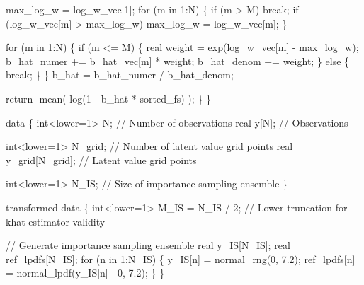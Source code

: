 \documentclass[
  letterpaper,
  DIV=11,
  numbers=noendperiod]{scrartcl}
\newenvironment{Shaded}{\begin{snugshade}}{\end{snugshade}}
\newcommand{\CommentTok}[1]{\textcolor[rgb]{0.37,0.37,0.37}{#1}}
\newcommand{\ControlFlowTok}[1]{\textcolor[rgb]{0.00,0.23,0.31}{#1}}
\newcommand{\DataTypeTok}[1]{\textcolor[rgb]{0.68,0.00,0.00}{#1}}
\newcommand{\DecValTok}[1]{\textcolor[rgb]{0.68,0.00,0.00}{#1}}
\newcommand{\FloatTok}[1]{\textcolor[rgb]{0.68,0.00,0.00}{#1}}
\newcommand{\KeywordTok}[1]{\textcolor[rgb]{0.00,0.23,0.31}{#1}}
\newcommand{\NormalTok}[1]{\textcolor[rgb]{0.00,0.23,0.31}{#1}}
\begin{document}
\begin{codelisting}
\begin{Shaded}
\begin{Highlighting}[]
\NormalTok{    max\_log\_w = log\_w\_vec[}\DecValTok{1}\NormalTok{];}
    \ControlFlowTok{for}\NormalTok{ (m }\ControlFlowTok{in} \DecValTok{1}\NormalTok{:N) \{}
      \ControlFlowTok{if}\NormalTok{ (m \textgreater{} M) }\ControlFlowTok{break}\NormalTok{;}
      \ControlFlowTok{if}\NormalTok{ (log\_w\_vec[m] \textgreater{} max\_log\_w) max\_log\_w = log\_w\_vec[m];}
\NormalTok{    \}}

    \ControlFlowTok{for}\NormalTok{ (m }\ControlFlowTok{in} \DecValTok{1}\NormalTok{:N) \{}
      \ControlFlowTok{if}\NormalTok{ (m \textless{}= M) \{}
        \DataTypeTok{real}\NormalTok{ weight = exp(log\_w\_vec[m] {-} max\_log\_w);}
\NormalTok{        b\_hat\_numer += b\_hat\_vec[m] * weight;}
\NormalTok{        b\_hat\_denom += weight;}
\NormalTok{      \} }\ControlFlowTok{else}\NormalTok{ \{}
        \ControlFlowTok{break}\NormalTok{;}
\NormalTok{      \}}
\NormalTok{    \}}
\NormalTok{    b\_hat = b\_hat\_numer / b\_hat\_denom;}

    \ControlFlowTok{return}\NormalTok{ {-}mean( log(}\DecValTok{1}\NormalTok{ {-} b\_hat * sorted\_fs) );}
\NormalTok{  \}}
\NormalTok{\}}

\KeywordTok{data}\NormalTok{ \{}
  \DataTypeTok{int}\NormalTok{\textless{}}\KeywordTok{lower}\NormalTok{=}\DecValTok{1}\NormalTok{\textgreater{} N; }\CommentTok{// Number of observations}
  \DataTypeTok{real}\NormalTok{ y[N];      }\CommentTok{// Observations}

  \DataTypeTok{int}\NormalTok{\textless{}}\KeywordTok{lower}\NormalTok{=}\DecValTok{1}\NormalTok{\textgreater{} N\_grid; }\CommentTok{// Number of latent value grid points}
  \DataTypeTok{real}\NormalTok{ y\_grid[N\_grid]; }\CommentTok{// Latent value grid points}

  \DataTypeTok{int}\NormalTok{\textless{}}\KeywordTok{lower}\NormalTok{=}\DecValTok{1}\NormalTok{\textgreater{} N\_IS; }\CommentTok{// Size of importance sampling ensemble}
\NormalTok{\}}

\KeywordTok{transformed data}\NormalTok{ \{}
  \DataTypeTok{int}\NormalTok{\textless{}}\KeywordTok{lower}\NormalTok{=}\DecValTok{1}\NormalTok{\textgreater{} M\_IS = N\_IS / }\DecValTok{2}\NormalTok{; }\CommentTok{// Lower truncation for khat estimator validity}

  \CommentTok{// Generate importance sampling ensemble}
  \DataTypeTok{real}\NormalTok{ y\_IS[N\_IS];}
  \DataTypeTok{real}\NormalTok{ ref\_lpdfs[N\_IS];}
  \ControlFlowTok{for}\NormalTok{ (n }\ControlFlowTok{in} \DecValTok{1}\NormalTok{:N\_IS) \{}
\NormalTok{    y\_IS[n] = normal\_rng(}\DecValTok{0}\NormalTok{, }\FloatTok{7.2}\NormalTok{);}
\NormalTok{    ref\_lpdfs[n] = normal\_lpdf(y\_IS[n] | }\DecValTok{0}\NormalTok{, }\FloatTok{7.2}\NormalTok{);}
\NormalTok{  \}}
\NormalTok{\}}


\end{Highlighting}
\end{Shaded}
\end{codelisting}
\end{document}
